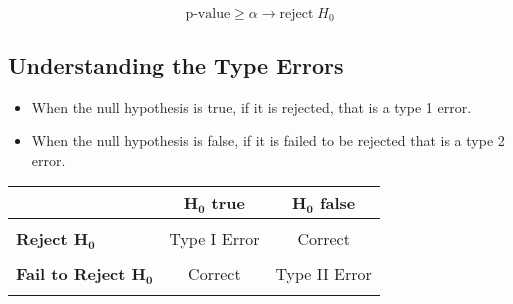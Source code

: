 \documentclass[12pt]{article}
\begin{document}
\begin{equation}
  \text{p-value}\ge \alpha \rightarrow \text{reject}\; H_{0}
\end{equation}
\subsection*{Understanding the Type Errors}
\begin{itemize}
  \item When the null hypothesis is true, if it is rejected, that is a type 1 error.
  \item When the null hypothesis is false, if it is failed to be rejected that is a type 2 error.
\end{itemize}
\begin{table}[h!]
\begin{center}
  \begin{tabular}{l c c}
    & \textbf{$\bm{H_{0}}$ true} & \textbf{$\bm{H_{0}}$ false}\\
    \midrule \\
    \textbf{Reject $\bm{H_{0}}$} & Type I Error & Correct \\ \\
    \textbf{Fail to Reject $\bm{H_{0}}$} & Correct & Type II Error\\ \\
    \bottomrule
  \end{tabular}
\end{center}
\end{table}
\end{document}
